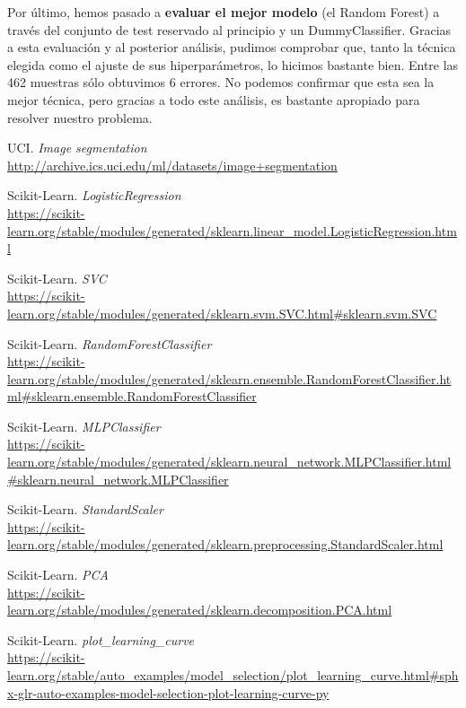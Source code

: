 \documentclass[11pt,a4paper]{article}
\begin{document}
Por último, hemos pasado a \textbf{evaluar el mejor modelo} (el Random Forest) a través del conjunto de test reservado
al principio y un DummyClassifier. Gracias a esta evaluación y al posterior análisis, pudimos comprobar que, tanto la técnica elegida como
el ajuste de sus hiperparámetros, lo hicimos bastante bien. Entre las 462 muestras sólo obtuvimos 6 errores. No podemos confirmar que esta
sea la mejor técnica, pero gracias a todo este análisis, es bastante apropiado para resolver nuestro problema.

\newpage

\begin{thebibliography}{25}

UCI. \textit{Image segmentation}
\\\url{http://archive.ics.uci.edu/ml/datasets/image+segmentation}

Scikit-Learn. \textit{LogisticRegression}
\\\url{https://scikit-learn.org/stable/modules/generated/sklearn.linear_model.LogisticRegression.html}

Scikit-Learn. \textit{SVC}
\\\url{https://scikit-learn.org/stable/modules/generated/sklearn.svm.SVC.html#sklearn.svm.SVC}

Scikit-Learn. \textit{RandomForestClassifier}
\\\url{https://scikit-learn.org/stable/modules/generated/sklearn.ensemble.RandomForestClassifier.html#sklearn.ensemble.RandomForestClassifier}

Scikit-Learn. \textit{MLPClassifier}
\\\url{https://scikit-learn.org/stable/modules/generated/sklearn.neural_network.MLPClassifier.html#sklearn.neural_network.MLPClassifier}

Scikit-Learn. \textit{StandardScaler}
\\\url{https://scikit-learn.org/stable/modules/generated/sklearn.preprocessing.StandardScaler.html}

Scikit-Learn. \textit{PCA}
\\\url{https://scikit-learn.org/stable/modules/generated/sklearn.decomposition.PCA.html}

Scikit-Learn. \textit{plot\_learning\_curve}
\\\url{https://scikit-learn.org/stable/auto_examples/model_selection/plot_learning_curve.html#sphx-glr-auto-examples-model-selection-plot-learning-curve-py}


\end{thebibliography}
\end{document}
